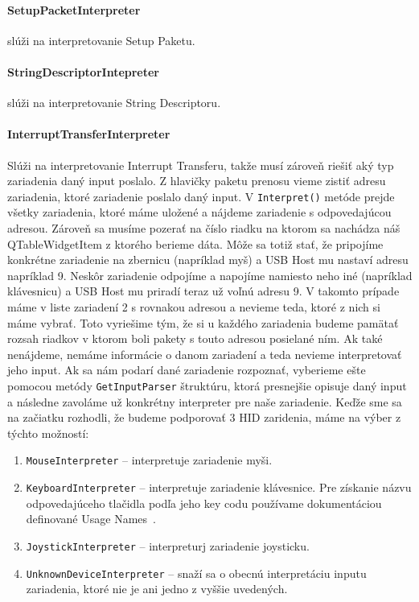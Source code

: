 \paragraph{SetupPacketInterpreter} slúži na interpretovanie Setup Paketu.

\paragraph{StringDescriptorIntepreter} slúži na interpretovanie String Descriptoru.

\paragraph{InterruptTransferInterpreter}
\hfill \break
Slúži na interpretovanie Interrupt Transferu, takže musí zároveň riešiť aký typ zariadenia daný input poslalo. Z hlavičky paketu prenosu vieme zistiť adresu zariadenia, ktoré zariadenie poslalo daný input. V \texttt{Interpret()} metóde prejde všetky zariadenia, ktoré máme uložené a nájdeme zariadenie s odpovedajúcou adresou. Zároveň sa musíme pozerať na číslo riadku na ktorom sa nachádza náš QTableWidgetItem z ktorého berieme dáta. Môže sa totiž stať, že pripojíme konkrétne zariadenie na zbernicu (napríklad myš) a USB Host mu nastaví adresu napríklad 9. Neskôr zariadenie odpojíme a napojíme namiesto neho iné (napríklad klávesnicu) a USB Host mu priradí teraz už voľnú adresu 9. V takomto prípade máme v liste zariadení 2 s rovnakou adresou a nevieme teda, ktoré z nich si máme vybrať. Toto vyriešime tým, že si u každého zariadenia budeme pamätať rozsah riadkov v ktorom boli pakety s touto adresou posielané ním. Ak také nenájdeme, nemáme informácie o danom zariadení a teda nevieme interpretovať jeho input. Ak sa nám podarí dané zariadenie rozpoznať, vyberieme ešte pomocou metódy \texttt{GetInputParser} štruktúru, ktorá presnejšie opisuje daný input a následne zavoláme už konkrétny interpreter pre naše zariadenie. Keďže sme sa na začiatku rozhodli, že budeme podporovať 3 HID zaridenia, máme na výber z týchto možností:
\begin{enumerate}
\item \texttt{MouseInterpreter} -- interpretuje zariadenie myši.
\item \texttt{KeyboardInterpreter} -- interpretuje zariadenie klávesnice. Pre získanie názvu odpovedajúceho tlačidla podľa jeho key codu používame dokumentáciou definované Usage Names~\cite{keyboard_keycodes_names}.
\item \texttt{JoystickInterpreter} -- interpreturj zariadenie joysticku.
\item \texttt{UnknownDeviceInterpreter} -- snaží sa o obecnú interpretáciu inputu zariadenia, ktoré nie je ani jedno z vyššie uvedených.
\end{enumerate}

